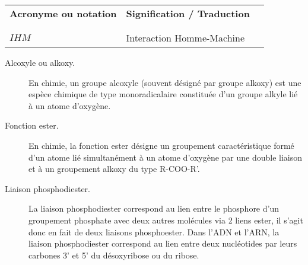 


\begin{table}[htbp]
\centering
\begin{tabular}{l l l}

\textbf{Acronyme ou notation} & \textbf{Signification / Traduction} & \\ \\ %
\hline
\\

$IHM$ & Interaction Homme-Machine & \\

\end{tabular}
\end{table}

\begin{description}
    \item[Alcoxyle ou alkoxy.] En chimie, un groupe alcoxyle (souvent désigné par groupe alkoxy) est une espèce chimique de type monoradicalaire constituée d'un groupe alkyle lié à un atome d'oxygène.
    \item[Fonction ester.] En chimie, la fonction ester désigne un groupement caractéristique formé d'un atome lié simultanément à un atome d'oxygène par une double liaison et à un groupement alkoxy du type R-COO-R'.
    \item[Liaison phosphodiester.] La liaison phosphodiester correspond au lien entre le phosphore d'un groupement phosphate avec deux autres molécules via 2 liens ester, il s'agit donc en fait de deux liaisons phosphoester. Dans l’ADN et l’ARN, la liaison phosphodiester correspond au lien entre deux nucléotides par leurs carbones 3’ et 5’ du désoxyribose ou du ribose.
\end{description}



